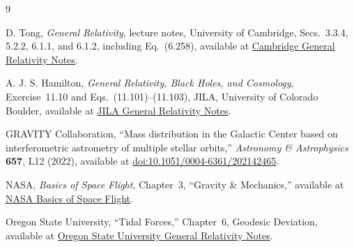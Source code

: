 \documentclass[12pt]{article}
\begin{document}
\begin{thebibliography}{9}
\small
{}
\raggedright
{}

D. Tong,
\emph{General Relativity},
lecture notes, University of Cambridge, Secs.~3.3.4, 5.2.2, 6.1.1, and 6.1.2, including Eq.~(6.258),
available at \href{https://www.damtp.cam.ac.uk/user/tong/gr/grhtml/}{Cambridge General Relativity Notes}.

A. J. S. Hamilton,
\emph{General Relativity, Black Holes, and Cosmology},
Exercise~11.10 and Eqs.~(11.101)--(11.103),
JILA, University of Colorado Boulder,
available at \href{https://jila.colorado.edu/~ajsh/courses/astr5770_21/grbook.pdf}{JILA General Relativity Notes}.

GRAVITY Collaboration,
``Mass distribution in the Galactic Center based on interferometric astrometry of multiple stellar orbits,''
\emph{Astronomy \& Astrophysics} \textbf{657}, L12 (2022),
available at \href{https://doi.org/10.1051/0004-6361/202142465}{doi:10.1051/0004-6361/202142465}.

NASA,
\emph{Basics of Space Flight},
Chapter~3, ``Gravity \& Mechanics,''
available at \href{https://science.nasa.gov/learn/basics-of-space-flight/chapter3-3/}{NASA Basics of Space Flight}.

Oregon State University,
``Tidal Forces,''
Chapter~6, Geodesic Deviation,
available at \href{https://sites.science.oregonstate.edu/physics/coursewikis/GGR/book/ggr/tidal.html}{Oregon State University General Relativity Notes}.

\end{thebibliography}
\end{document}
